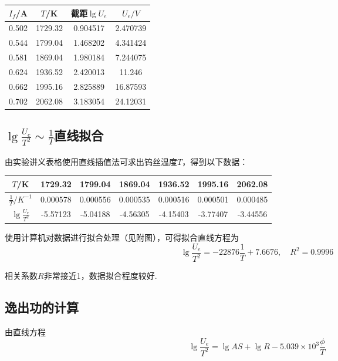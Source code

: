 \documentclass{thureport}
\begin{document}
\begin{table}[H]
    \centering
      \begin{tabular}{|c|c|c|c|}
      \hline
      $I_f$/A & $T$/K & 截距$\lg{U_e}$ & $U_e/V$ \bigstrut\\
      \hline
      0.502 & 1729.32 & 0.904517 & 2.470739 \bigstrut\\
      \hline
      0.544 & 1799.04 & 1.468202 & 4.341424 \bigstrut\\
      \hline
      0.581 & 1869.04 & 1.980184 & 7.244075 \bigstrut\\
      \hline
      0.624 & 1936.52 & 2.420013 & 11.246 \bigstrut\\
      \hline
      0.662 & 1995.16 & 2.825889 & 16.87593 \bigstrut\\
      \hline
      0.702 & 2062.08 & 3.183054 & 24.12031 \bigstrut\\
      \hline
      \end{tabular}%
  \end{table}%

\subsection{$\lg{\frac{U_e}{T^2}}\sim\frac{1}{T}$直线拟合}
由实验讲义表格使用直线插值法可求出钨丝温度$T$，得到以下数据：
\begin{table}[H]
    \centering
      \begin{tabular}{|c|c|c|c|c|c|c|}
      \hline
      $T$/K & 1729.32 & 1799.04 & 1869.04 & 1936.52 & 1995.16 & 2062.08 \bigstrut\\
      \hline
      $\frac{1}{T}/K^{-1}$ & 0.000578 & 0.000556 & 0.000535 & 0.000516 & 0.000501 & 0.000485 \bigstrut\\
      \hline
      $\lg{\frac{U_e}{T^2}}$ & -5.57123 & -5.04188 & -4.56305 & -4.15403 & -3.77407 & -3.44556 \bigstrut\\
      \hline
      \end{tabular}%
  \end{table}%

使用计算机对数据进行拟合处理（见附图），可得拟合直线方程为
$$\lg{\frac{U_e}{T^2}}=-22876\frac{1}{T}+7.6676,\quad R^2=0.9996$$

相关系数$R$非常接近1，数据拟合程度较好.

\subsection{逸出功的计算}
由直线方程
$$\lg\frac{U_e}{T^2}=\lg{AS}+\lg{R}-5.039\times10^3\frac{\phi}{T}$$
\end{document}
